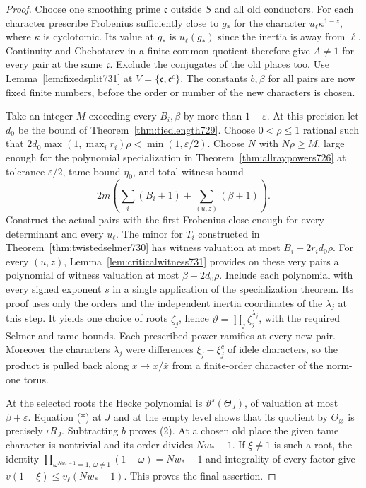 \documentclass[a4paper,11pt]{article}
\theoremstyle{definition}
\theoremstyle{remark}
\numberwithin{equation}{section}
\begin{document}
\begin{proof}
Choose one smoothing prime \(\mathfrak c\) outside \(S\) and all old
conductors. For each character prescribe Frobenius sufficiently close
to \(g_*\) for the character \(u_\ell\kappa^{1-z}\), where
\(\kappa\) is cyclotomic. Its value at \(g_*\) is \(u_\ell(g_*)\)
since the inertia is away from \(\ell\). Continuity and
Chebotarev in a finite common quotient therefore give
\(A\ne1\) for every pair at the same \(\mathfrak c\). Exclude the
conjugates of the old places too. Use
Lemma~\ref{lem:fixedsplit731} at
\(V=\{\mathfrak c,\mathfrak c^c\}\).
The constants \(b,\beta\) for all pairs are now fixed finite
numbers, before the order or number of the new characters is chosen.

Take an integer \(M\) exceeding every \(B_i,\beta\) by more than
\(1+\varepsilon\). At this precision let \(d_0\) be the bound of
Theorem~\ref{thm:tiedlength729}. Choose \(0<\rho\le1\) rational
such that \(2d_0\max(1,\max_i r_i)\rho<\min(1,\varepsilon/2)\).
Choose \(N\) with \(N\rho\ge M\), large enough for the polynomial
specialization in Theorem~\ref{thm:allraypowers726} at tolerance
\(\varepsilon/2\), tame bound \(\eta_0\), and total witness bound
\[
     2m\left(\sum_i(B_i+1)+\sum_{(u,z)}(\beta+1)\right).
\]
Construct the actual pairs with the first Frobenius close enough
for every determinant and every \(u_\ell\). The minor for \(T_i\)
constructed in Theorem~\ref{thm:twistedselmer730} has witness
valuation at most \(B_i+2r_id_0\rho\). For every \((u,z)\),
Lemma~\ref{lem:criticalwitness731} provides on these very pairs a
polynomial of witness valuation at most \(\beta+2d_0\rho\).
Include each polynomial with every signed exponent \(s\) in a single
application of the specialization theorem. Its proof uses only the
orders and the independent inertia coordinates of the \(\lambda_j\)
at this step. It yields one choice of roots \(\zeta_j\), hence
\(\vartheta=\prod_j\zeta_j^{\lambda_j}\), with the required Selmer
and tame bounds. Each prescribed power ramifies at every new pair.
Moreover the characters \(\lambda_j\) were differences
\(\xi_j-\xi_j^c\) of idele characters, so the product is pulled
back along \(x\mapsto x/\bar x\) from a finite-order character of
the norm-one torus.

At the selected roots the Hecke polynomial is
\(\vartheta^s(\Theta_J)\), of valuation at most
\(\beta+\varepsilon\). Equation (*) at \(J\) and at the empty level
shows that its quotient by \(\Theta_\varnothing\) is precisely
\(\iota R_J\). Subtracting \(b\) proves (2). At a chosen old place
the given tame character is nontrivial and its order divides
\(Nw_*-1\). If \(\xi\ne1\) is such a root, the identity
\(\prod_{\omega^{Nw_*-1}=1,\ \omega\ne1}(1-\omega)=Nw_*-1\)
and integrality of every factor give
\(v(1-\xi)\le v_\ell(Nw_*-1)\). This proves the final assertion.
\end{proof}
\end{document}
